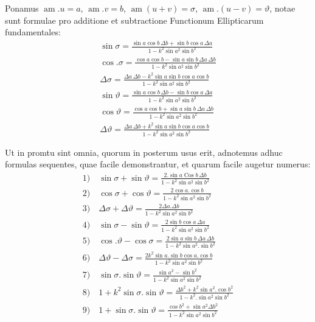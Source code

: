 \documentclass{article}
\begin{document}
Ponamus $\operatorname{am}.u=a$, $\operatorname{am}.v=b$, $\operatorname{am}(u+v)=\sigma$, $\operatorname{am}.(u-v)=\vartheta$, notae sunt formulae pro additione et subtractione Functionum Ellipticarum fundamentales:
\[
\begin{gathered}
\sin\sigma=\frac{\sin a\cos b\,\Delta b+\sin b\cos a\,\Delta a}{1-k^{2}\sin a^{2}\sin b^{2}}\\[1ex]
\cos.\sigma=\frac{\cos a\cos b-\sin a\sin b\,\Delta a\,\Delta b}{1-k^{2}\sin a^{2}\sin b^{2}}\\[1ex]
\Delta\sigma=\frac{\Delta a\,\Delta b-k^{2}\sin a\sin b\cos a\cos b}{1-k^{2}\sin a^{2}\sin b^{2}}\\[1ex]
\sin\vartheta=\frac{\sin a\cos b\,\Delta b-\sin b\cos a\,\Delta a}{1-k^{2}\sin a^{2}\sin b^{2}}\\[1ex]
\cos\vartheta=\frac{\cos a\cos b+\sin a\sin b\,\Delta a\,\Delta b}{1-k^{2}\sin a^{2}\sin b^{2}}\\[1ex]
\Delta\vartheta=\frac{\Delta a\,\Delta b+k^{2}\sin a\sin b\cos a\cos b}{1-k^{2}\sin a^{2}\sin b^{2}}
\end{gathered}
\]

Ut in promtu sint omnia, quorum in posterum usus erit, adnotemus adhuc formulas sequentes, quae facile demonstrantur, et quarum facile augetur numerus:
\[
\begin{gathered}
\text{1)}\quad\sin\sigma+\sin\vartheta=\frac{2.\sin a\operatorname{Cos}b\,\Delta b}{1-k^{2}\sin a^{2}\sin b^{2}}\\[1ex]
\text{2)}\quad\cos\sigma+\cos\vartheta=\frac{2\cos a.\cos b}{1-k^{2}\sin a^{2}\sin b^{2}}\\[1ex]
\text{3)}\quad\Delta\sigma+\Delta\vartheta=\frac{2\Delta a.\Delta b}{1-k^{2}\sin a^{2}\sin b^{2}}\\[1ex]
\text{4)}\quad\sin\sigma-\sin\vartheta=\frac{2\sin b\cos a\,\Delta a}{1-k^{2}\sin a^{2}\sin b^{2}}\\[1ex]
\text{5)}\quad\cos.\vartheta-\cos\sigma=\frac{2\sin a\sin b\,\Delta a\,\Delta b}{1-k^{2}\sin a^{2}.\sin b^{2}}\\[1ex]
\text{6)}\quad\Delta\vartheta-\Delta\sigma=\frac{2k^{2}\sin a.\sin b\cos a.\cos b}{1-k^{2}\sin a^{2}\sin b^{2}}\\[1ex]
\text{7)}\quad\sin\sigma.\sin\vartheta=\frac{\sin a^{2}-\sin b^{2}}{1-k^{2}\sin a^{2}\sin b^{2}}\\[1ex]
\text{8)}\quad1+k^{2}\sin\sigma.\sin\vartheta=\frac{\Delta b^{2}+k^{2}\sin a^{2}.\cos b^{2}}{1-k^{2}.\sin a^{2}\sin b^{2}}\\[1ex]
\text{9)}\quad1+\sin\sigma.\sin\vartheta=\frac{\cos b^{2}+\sin a^{2}\Delta b^{2}}{1-k^{2}\sin a^{2}\sin b^{2}}
\end{gathered}
\]
\end{document}
